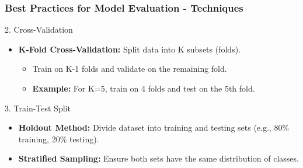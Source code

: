 \documentclass[aspectratio=169]{beamer}
\begin{document}
\begin{frame}[fragile]
    \frametitle{Best Practices for Model Evaluation - Techniques}
    \begin{block}{2. Cross-Validation}
        \begin{itemize}
            \item \textbf{K-Fold Cross-Validation:} Split data into K subsets (folds).
            \begin{itemize}
                \item Train on K-1 folds and validate on the remaining fold.
                \item \textbf{Example:} For K=5, train on 4 folds and test on the 5th fold.
            \end{itemize}
        \end{itemize}
    \end{block}

    \begin{block}{3. Train-Test Split}
        \begin{itemize}
            \item \textbf{Holdout Method:} Divide dataset into training and testing sets (e.g., 80\% training, 20\% testing).
            \item \textbf{Stratified Sampling:} Ensure both sets have the same distribution of classes.
        \end{itemize}
    \end{block}
\end{frame}
\end{document}
